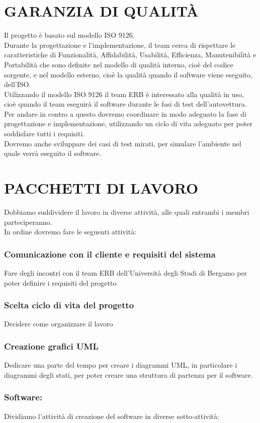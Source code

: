 \documentclass{report}
\begin{document}
\chapter{GARANZIA DI QUALITÀ}
Il progetto è basato sul modello ISO 9126.\\
Durante la progettazione e l'implementazione, il team cerca di rispettare le caratteristiche di Funzionalità, Affidabilità, Usabilità, Efficienza, Manutenibilità e Portabilità che sono definite nel modello di qualità interno, cioè del codice sorgente, e nel modello esterno, cioè la qualità quando il software viene eseguito, dell'ISO.\\
Utilizzando il modello ISO 9126 il team ERB è interessato alla qualità in uso, cioè quando il team eseguirà il software durante le fasi di test dell'autovettura.\\
Per andare in contro a questo dovremo coordinare in modo adeguato la fase di progettazione e implementazione, utilizzando un ciclo di vita adeguato per poter soddisfare tutti i requisiti.\\
Dovremo anche sviluppare dei casi di test mirati, per simulare l'ambiente nel quale verrà eseguito il software.


\chapter{PACCHETTI DI LAVORO}
Dobbiamo suddividere il lavoro in diverse attività, alle quali entrambi i membri parteciperanno.\\
In ordine dovremo fare le seguenti attività:
\subsection*{Comunicazione con il cliente e requisiti del sistema}
Fare degli incontri con il team ERB dell'Università degli Studi di Bergamo per poter definire i requisiti del progetto
\subsection{Scelta ciclo di vita del progetto}
Decidere come organizzare il lavoro
\subsection*{Creazione grafici UML}
Dedicare una parte del tempo per creare i diagrammi UML, in particolare i diagrammi degli stati, per poter creare una struttura di partenza per il software.
\subsection*{Software:}
Dividiamo l'attività di creazione del software in diverse sotto-attività:
\end{document}
